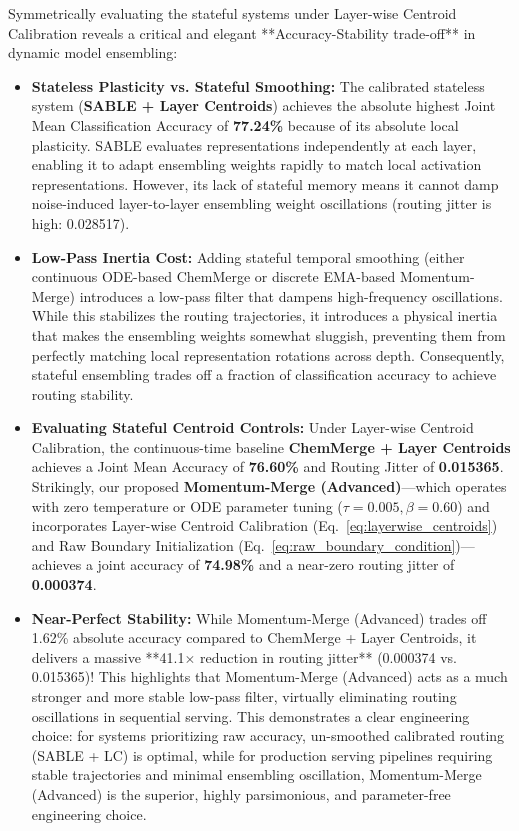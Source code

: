 Symmetrically evaluating the stateful systems under Layer-wise Centroid Calibration reveals a critical and elegant **Accuracy-Stability trade-off** in dynamic model ensembling:
\begin{itemize}
    \item \textbf{Stateless Plasticity vs. Stateful Smoothing:} The calibrated stateless system (\textbf{SABLE + Layer Centroids}) achieves the absolute highest Joint Mean Classification Accuracy of \textbf{77.24\%} because of its absolute local plasticity. SABLE evaluates representations independently at each layer, enabling it to adapt ensembling weights rapidly to match local activation representations. However, its lack of stateful memory means it cannot damp noise-induced layer-to-layer ensembling weight oscillations (routing jitter is high: 0.028517).
    \item \textbf{Low-Pass Inertia Cost:} Adding stateful temporal smoothing (either continuous ODE-based ChemMerge or discrete EMA-based Momentum-Merge) introduces a low-pass filter that dampens high-frequency oscillations. While this stabilizes the routing trajectories, it introduces a physical inertia that makes the ensembling weights somewhat sluggish, preventing them from perfectly matching local representation rotations across depth. Consequently, stateful ensembling trades off a fraction of classification accuracy to achieve routing stability.
    \item \textbf{Evaluating Stateful Centroid Controls:} Under Layer-wise Centroid Calibration, the continuous-time baseline \textbf{ChemMerge + Layer Centroids} achieves a Joint Mean Accuracy of \textbf{76.60\%} and Routing Jitter of \textbf{0.015365}. Strikingly, our proposed \textbf{Momentum-Merge (Advanced)}—which operates with zero temperature or ODE parameter tuning ($\tau=0.005, \beta=0.60$) and incorporates Layer-wise Centroid Calibration (Eq.~\ref{eq:layerwise_centroids}) and Raw Boundary Initialization (Eq.~\ref{eq:raw_boundary_condition})—achieves a joint accuracy of \textbf{74.98\%} and a near-zero routing jitter of \textbf{0.000374}.
    \item \textbf{Near-Perfect Stability:} While Momentum-Merge (Advanced) trades off 1.62\% absolute accuracy compared to ChemMerge + Layer Centroids, it delivers a massive **41.1$\times$ reduction in routing jitter** (0.000374 vs. 0.015365)! This highlights that Momentum-Merge (Advanced) acts as a much stronger and more stable low-pass filter, virtually eliminating routing oscillations in sequential serving. This demonstrates a clear engineering choice: for systems prioritizing raw accuracy, un-smoothed calibrated routing (SABLE + LC) is optimal, while for production serving pipelines requiring stable trajectories and minimal ensembling oscillation, Momentum-Merge (Advanced) is the superior, highly parsimonious, and parameter-free engineering choice.
\end{itemize}


